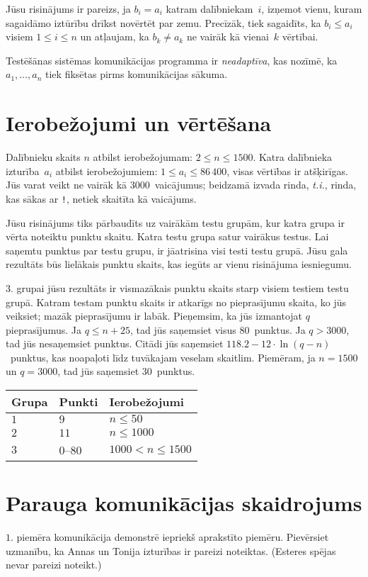 Jūsu risinājums ir pareizs, ja $b_i=a_i$ katram dalībniekam~$i$, izņemot vienu, kuram sagaidāmo iztūrību drīkst novērtēt par zemu. Precīzāk, tiek sagaidīts, ka $b_i\leq a_i$ visiem $1\leq i\leq n$ un atļaujam, ka $b_k \neq a_k$ ne vairāk kā vienai~$k$ vērtībai.

Testēšānas sistēmas komunikācijas programma ir \emph{neadaptīva}, kas nozīmē, ka $a_1,\ldots, a_n$ tiek fiksētas pirms komunikācijas sākuma.


\section*{Ierobežojumi un vērtēšana}

Dalībnieku skaits $n$ atbilst ierobežojumam:
$2\leq n\leq 1500$. %
Katra dalībnieka izturība~$a_i$ atbilst ierobežojumiem: 
$1\leq a_i\leq 86\,400$, %
visas vērtības ir atšķirīgas. %
Jūs varat veikt 
ne vairāk kā $3000$~vaicājumus; %
beidzamā izvada rinda, \emph{t.i.}, rinda, kas sākas ar \texttt{!}, netiek skaitīta kā vaicājums.

Jūsu risinājums tiks pārbaudīts uz vairākām testu grupām, kur katra grupa ir vērta noteiktu punktu skaitu.
Katra testu grupa satur vairākus testus.
Lai saņemtu punktus par testu grupu, ir jāatrisina visi testi testu grupā.
Jūsu gala rezultāts būs lielākais punktu skaits, kas iegūts ar vienu risinājuma iesniegumu.

$3.$ grupai jūsu rezultāts ir vismazākais punktu skaits starp visiem testiem testu grupā.
Katram testam punktu skaits ir atkarīgs no pieprasījumu skaita, ko jūs veiksiet; 
mazāk pieprasījumu ir labāk.
Pieņemsim, ka jūs izmantojat $q$ pieprasījumus.
Ja $q \le n+25$, tad jūs saņemsiet visus $80$~punktus.
Ja $q > 3000$, tad jūs nesaņemsiet punktus.
Citādi jūs saņemsiet 
$118.2 - 12 \cdot \ln(q - n)$~punktus, kas noapaļoti līdz tuvākajam veselam skaitlim. %
Piemēram, ja $n = 1500$ un $q = 3000$, tad jūs saņemsiet $30$~punktus.

\medskip
\begin{tabular}{lll}
Grupa & Punkti & Ierobežojumi\\\hline
$1$  &  $9$ & $n\leq 50$\\
$2$  &  $11$ & $n\leq 1000$\\
$3$  &  $0$--$80$ & $1000 < n\leq 1500$\\
\end{tabular}

\section*{Parauga komunikācijas skaidrojums}

$1.$ piemēra komunikācija demonstrē iepriekš aprakstīto piemēru.
Pievērsiet uzmanību, ka Annas un Tonija izturības ir pareizi noteiktas.
(Esteres spējas nevar pareizi noteikt.)
